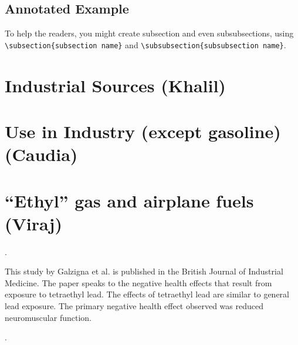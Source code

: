 \documentclass{article}\usepackage[]{graphicx}\usepackage[]{color}
\begin{document}
\subsection{Annotated Example}

\bigskip
\noindent %

\bigskip


To help the readers, you might create subsection and even subsubsections, using \verb!\subsection{subsection name}! and \verb!\subsubsection{subsubsection name}!. 


\section{Industrial Sources (Khalil)}


\section{Use in Industry (except gasoline) (Caudia)}

\section{``Ethyl'' gas and airplane fuels (Viraj)}


\bigskip
\noindent {} .

This study by Galzigna et al. is published in the British Journal of Industrial Medicine. The paper speaks to the negative health effects that result from exposure to tetraethyl lead. The effects of tetraethyl lead are similar to general lead exposure. The primary negative health effect observed was reduced neuromuscular function.

\bigskip

\noindent {} .
\end{document}
